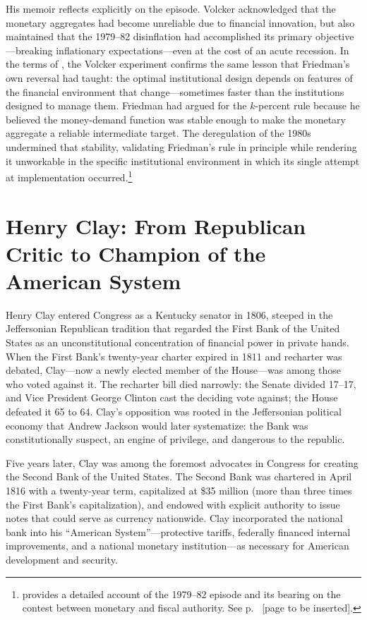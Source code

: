 \documentclass[12pt]{article}
\begin{document}
His memoir \citep{VolckerHarper2018} reflects explicitly on the episode.
Volcker acknowledged that the monetary aggregates had become unreliable
due to financial innovation, but also maintained that the 1979--82
disinflation had accomplished its primary objective---breaking
inflationary expectations---even at the cost of an acute recession.
In the terms of \citet{Sargent2011}, the Volcker experiment confirms
the same lesson that Friedman's own reversal had taught: the optimal
institutional design depends on features of the financial environment
that change---sometimes faster than the institutions designed to manage
them.  Friedman had argued for the $k$-percent rule because he believed
the money-demand function was stable enough to make the monetary
aggregate a reliable intermediate target.  The deregulation of the 1980s
undermined that stability, validating Friedman's rule in principle while
rendering it unworkable in the specific institutional environment in
which its single attempt at implementation occurred.\footnote{\citet{Silber2012}
  provides a detailed account of the 1979--82 episode and its bearing
  on the contest between monetary and fiscal authority.  See p.~\pageref{} [page
  to be inserted].}


\section{Henry Clay: From Republican Critic to Champion of the American
         System}

Henry Clay entered Congress as a Kentucky senator in 1806, steeped in
the Jeffersonian Republican tradition that regarded the First Bank of
the United States as an unconstitutional concentration of financial power
in private hands.  When the First Bank's twenty-year charter expired in
1811 and recharter was debated, Clay---now a newly elected member of the
House---was among those who voted against it.  The recharter bill died
narrowly: the Senate divided 17--17, and Vice President George Clinton
cast the deciding vote against; the House defeated it 65 to 64.  Clay's opposition was rooted in the Jeffersonian political economy that Andrew
Jackson would later systematize: the Bank was constitutionally suspect,
an engine of privilege, and dangerous to the republic.

Five years later, Clay was among the foremost advocates in Congress
for creating the Second Bank of the United States.  The Second Bank was
chartered in April 1816 with a twenty-year term, capitalized at \$35
million (more than three times the First Bank's capitalization), and
endowed with explicit authority to issue notes that could serve as
currency nationwide.  Clay incorporated the national bank into his
``American System''---protective tariffs, federally financed internal
improvements, and a national monetary institution---as necessary for
American development and security.
\end{document}

